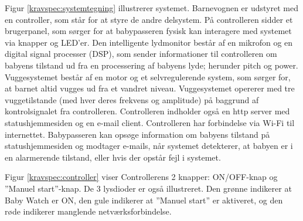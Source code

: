 Figur \ref{kravspec:systemtegning} illustrerer systemet. Barnevognen er udstyret med en controller, som står for at styre de andre delsystem. På controlleren sidder et brugerpanel, som sørger for at babypasseren fysisk kan interagere med systemet via knapper og LED'er.
Den intelligente lydmonitor består af en mikrofon og en digital signal processer (DSP), som sender informationer til controlleren om babyens tilstand ud fra en processering af babyens lyde; herunder pitch og power. Vuggesystemet består af en motor og et selvregulerende system, som sørger for, at barnet altid vugges ud fra et vandret niveau. Vuggesystemet opererer med tre vuggetilstande (med hver deres frekvens og amplitude) på baggrund af kontrolsignalet fra controlleren. Controlleren indholder også en http server med statushjemmesiden og en e-mail client. Controlleren har forbindelse via Wi-Fi til internettet. Babypasseren kan opsøge information om babyens tilstand på statushjemmesiden og modtager e-mails, når systemet detekterer, at babyen er i en alarmerende tilstand, eller hvis der opstår fejl i systemet.


Figur \ref{kravspec:controller} viser Controllerens 2 knapper: ON/OFF-knap og ''Manuel start''-knap. De 3 lysdioder er også illustreret. Den grønne indikerer at Baby Watch er ON, den gule indikerer at ''Manuel start'' er aktiveret, og den røde indikerer manglende netværksforbindelse. 